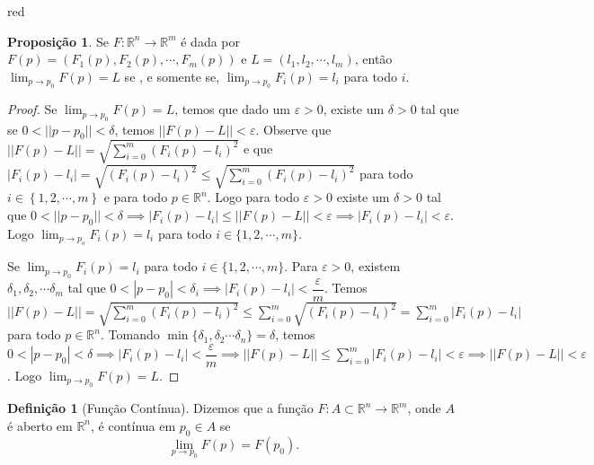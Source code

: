 \documentclass[12pt,leqno,twoside]{amsart}
\theoremstyle{definition}
\newtheorem{proposicao}{Proposição}[section]
\newtheorem{definicao}{Definição}[section]
\begin{document}
\begin{color}{red}
\begin{proposicao}
	\label{prop:limcomp}
	Se $F:\mathbb{R}^n\to \mathbb{R}^m$ é dada por $F(p) = (F_1(p), F_2(p),\cdots, F_m(p))$ e $L = (l_1,l_2,\cdots,l_m)$, então $\displaystyle\lim_{p\to p_0} F(p) = L $ se , e somente se, $\displaystyle\lim_{p\to p_0} F_i(p) = l_i$ para todo $i$.
\end{proposicao}
\begin{proof}
	Se $\displaystyle\lim_{p \to p_0} F(p) = L$, temos que dado um $\varepsilon>0$, existe um $\delta > 0$ tal que se $ 0< ||p-p_0||< \delta$, temos $ ||F(p) -L || < \varepsilon$. Observe que $ ||F(p) - L|| = \sqrt{\displaystyle \sum_{i = 0}^m \left(F_i(p) - l_i\right)^2}$ e que $|F_i(p) - l_i | = \sqrt{\left( F_i(p) - l_i\right)^2} \leq\sqrt{\displaystyle \sum_{i = 0}^m \left(F_i(p) - l_i\right)^2}$ para todo $i\in \left\{1,2,\cdots,m\right\}$ e para todo $p\in \mathbb{R}^n$. Logo para todo $\varepsilon>0$ existe um $\delta > 0$ tal que $ 0 < ||p-p_0|| < \delta \implies |F_i (p) -l_i|\leq || F(p) -L|| < \varepsilon \implies |F_i(p) - l_i | < \varepsilon $. Logo $\displaystyle \lim_{p \to p_o} F_i(p) = l_i$ para todo $i\in \{1,2,\cdots,m \}$.


	Se $\displaystyle\lim_{p \to p_0} F_i(p) = l_i$ para todo $i\in \{1,2,\cdots,m\}$. Para $\varepsilon>0$, existem $ \delta_1, \delta_2,\cdots \delta_m$ tal que $0<|p-p_0| < \delta_i \implies |F_i(p) - l_i| < \dfrac{\varepsilon}{m}$. Temos $|| F(p) - L || = \sqrt{\displaystyle \sum_{i = 0}^m \left(F_i(p) - l_i\right)^2} \leq \displaystyle \sum_{i = 0}^m \sqrt{ \left(F_i(p) - l_i\right)^2} = \displaystyle \sum_{i = 0}^m | F_i(p) - l_i | $ para todo $p\in \mathbb{R}^n$. Tomando $\min \{ \delta_1, \delta_2\cdots \delta_n\} = \delta$, temos $0<|p-p_0|<\delta \implies |F_i(p) -l_i| < \dfrac{\varepsilon}{m} \implies ||F(p) -L|| \leq \displaystyle \sum_{i = 0}^m | F_i(p) - l_i | < \varepsilon \implies ||F(p) -L || < \varepsilon $. Logo $\displaystyle\lim_{p \to p_0} F(p) = L$.
\end{proof}

\vspace{0.3cm}

\begin{definicao}[Função Contínua]
	Dizemos que a função $F:A\subset \mathbb{R}^n \to \mathbb{R}^m$, onde $A$ é aberto em $\mathbb{R}^n$, é contínua em $p_0\in A$ se $$\lim_{p\to p_0} F(p) = F(p_0).$$
\end{definicao}

\vspace{0.3cm}


\end{color}
\end{document}
